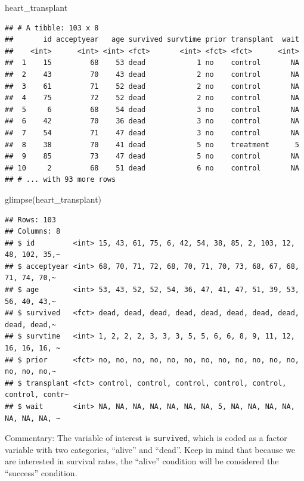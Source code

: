 \documentclass[
]{book}
\newenvironment{Shaded}{\begin{snugshade}}{\end{snugshade}}
\newcommand{\FunctionTok}[1]{\textcolor[rgb]{0.00,0.00,0.00}{#1}}
\newcommand{\NormalTok}[1]{#1}
\begin{document}
\begin{Shaded}
\begin{Highlighting}[]
\NormalTok{heart\_transplant}
\end{Highlighting}
\end{Shaded}

\begin{verbatim}
## # A tibble: 103 x 8
##       id acceptyear   age survived survtime prior transplant  wait
##    <int>      <int> <int> <fct>       <int> <fct> <fct>      <int>
##  1    15         68    53 dead            1 no    control       NA
##  2    43         70    43 dead            2 no    control       NA
##  3    61         71    52 dead            2 no    control       NA
##  4    75         72    52 dead            2 no    control       NA
##  5     6         68    54 dead            3 no    control       NA
##  6    42         70    36 dead            3 no    control       NA
##  7    54         71    47 dead            3 no    control       NA
##  8    38         70    41 dead            5 no    treatment      5
##  9    85         73    47 dead            5 no    control       NA
## 10     2         68    51 dead            6 no    control       NA
## # ... with 93 more rows
\end{verbatim}

\begin{Shaded}
\begin{Highlighting}[]
\FunctionTok{glimpse}\NormalTok{(heart\_transplant)}
\end{Highlighting}
\end{Shaded}

\begin{verbatim}
## Rows: 103
## Columns: 8
## $ id         <int> 15, 43, 61, 75, 6, 42, 54, 38, 85, 2, 103, 12, 48, 102, 35,~
## $ acceptyear <int> 68, 70, 71, 72, 68, 70, 71, 70, 73, 68, 67, 68, 71, 74, 70,~
## $ age        <int> 53, 43, 52, 52, 54, 36, 47, 41, 47, 51, 39, 53, 56, 40, 43,~
## $ survived   <fct> dead, dead, dead, dead, dead, dead, dead, dead, dead, dead,~
## $ survtime   <int> 1, 2, 2, 2, 3, 3, 3, 5, 5, 6, 6, 8, 9, 11, 12, 16, 16, 16, ~
## $ prior      <fct> no, no, no, no, no, no, no, no, no, no, no, no, no, no, no,~
## $ transplant <fct> control, control, control, control, control, control, contr~
## $ wait       <int> NA, NA, NA, NA, NA, NA, NA, 5, NA, NA, NA, NA, NA, NA, NA, ~
\end{verbatim}

Commentary: The variable of interest is \texttt{survived}, which is coded as a factor variable with two categories, ``alive'' and ``dead''. Keep in mind that because we are interested in survival rates, the ``alive'' condition will be considered the ``success'' condition.
\end{document}
